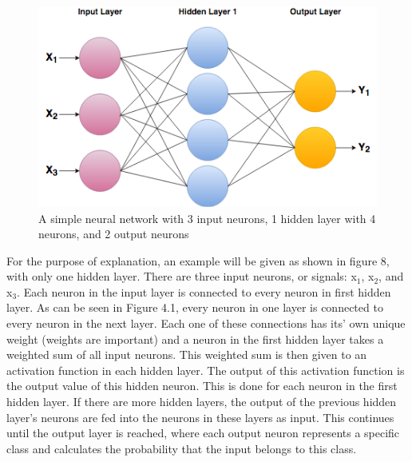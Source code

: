 \documentclass[12pt]{report} %
\begin{document}
\begin{figure}
\centering
\includegraphics[width=5in]{NeuralNetwork}
\caption{A simple neural network with 3 input neurons, 1 hidden layer with 4 neurons, and 2 output neurons}
\end{figure}
	For the purpose of explanation, an example will be given as shown in figure 8, with only one hidden layer. There are three input neurons, or signals: x$_{1}$, x$_{2}$, and x$_{3}$. Each neuron in the input layer is connected to every neuron in first hidden layer. As can be seen in Figure 4.1, every neuron in one layer is connected to every neuron in the next layer. Each one of these connections has its' own unique weight (weights are important) and a neuron in the first hidden layer takes a weighted sum of all input neurons. This weighted sum is then given to an activation function in each hidden layer. The output of this activation function is the output value of this hidden neuron. This is done for each neuron in the first hidden layer. If there are more hidden layers, the output of the previous hidden layer's neurons are fed into the neurons in these layers as input. This continues until the output layer is reached, where each output neuron represents a specific class and calculates the probability that the input belongs to this class.\cite{KubatMachineLearn}
	
\end{document}
